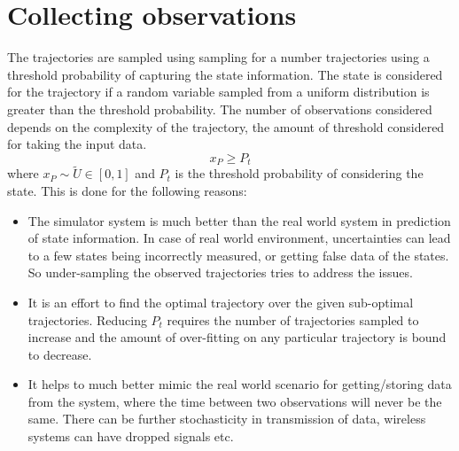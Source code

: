 \documentclass[hidelinks,BTech]{iitmdiss}
\begin{document}
\section{Collecting observations}
The trajectories are sampled using sampling for a number trajectories using a threshold probability of capturing the state information. The state is considered for the trajectory if a random variable sampled from a uniform distribution is greater than the threshold probability. The number of observations considered depends on the complexity of the trajectory, the amount of threshold considered for taking the input data. 
\begin{equation}
	x_P \geq P_t 	
\end{equation}
where $x_P \sim \tilde U\in[0,1]$ and $P_t$ is the threshold probability of considering the state. This is done for the following reasons:
\begin{itemize}
	\item The simulator system is much better than the real world system in prediction of state information. In case of real world environment, uncertainties can lead to a few states being incorrectly measured, or getting false data of the states. So under-sampling the observed trajectories tries to address the issues. 
	\item It is an effort to find the optimal trajectory over the given sub-optimal trajectories. Reducing $P_t$ requires the number of trajectories sampled to increase and the amount of over-fitting on any particular trajectory is bound to decrease. 
	\item It helps to much better mimic the real world scenario for getting/storing data from the system, where the time between two observations will never be the same. There can be further stochasticity in transmission of data, wireless systems can have dropped signals etc.
\end{itemize}
\end{document}
